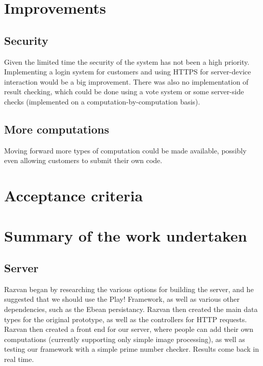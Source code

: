 \documentclass[a4paper,10pt]{article}
\begin{document}
\section{Improvements}

\subsection{Security}

Given the limited time the security of the system has not been a high priority.
Implementing a login system for customers and using HTTPS for server-device interaction would be a big improvement.
There was also no implementation of result checking, which could be done using a vote system or some server-side checks (implemented on a computation-by-computation basis).

\subsection{More computations}

Moving forward more types of computation could be made available, possibly even allowing customers to submit their own code.





\section{Acceptance criteria}


\section{Summary of the work undertaken}

\subsection{Server}



Razvan began by researching the various options for building the server, and he suggested that we should use the Play! Framework, as well as various other dependencies, such as the Ebean persistancy. Razvan then created the main data types for the original prototype, as well as the controllers for HTTP requests. 
Razvan then created a front end for our server, where people can add their own computations (currently supporting only simple image processing), as well as testing our framework with a simple  prime number checker. Results come back in real time.\\
\end{document}
